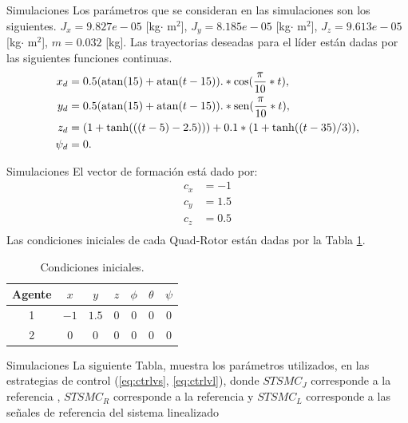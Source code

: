 \documentclass[hyperref={pdfpagelabels=false}]{beamer}
\begin{document}
\begin{frame}{Simulaciones}
Los parámetros que se consideran en las simulaciones son los siguientes.  $J_x=9.827e-05$ [kg$\cdot$ m$^2$], $J_y=8.185e-05$ [kg$\cdot$ m$^2$], $J_z=9.613e-05$ [kg$\cdot$ m$^2$], $m= 0.032$ [kg]. Las trayectorias deseadas para el líder están dadas por las siguientes funciones continuas.
\begin{equation}
\begin{split}
x_d &=0.5(\operatorname{atan}(15)+\operatorname{atan}(t-15)).*\cos(\frac{\pi}{10}*t),\\
y_d &=0.5(\operatorname{atan}(15)+\operatorname{atan}(t-15)).*\operatorname{sen}(\frac{\pi}{10}*t),\\
z_d &=(1+\operatorname{tanh}(((t-5)-2.5)))+0.1*(1+\operatorname{tanh}((t-35)/3)),\\
\psi_d &= 0.\\
\end{split}    
\end{equation}

\end{frame}

\begin{frame}{Simulaciones}
El vector de formación está dado por:
\begin{equation}
    \begin{split}
        c_x &= -1\\
        c_y &= 1.5\\
        c_z &= 0.5\\
    \end{split}
\end{equation}
Las condiciones iniciales de cada Quad-Rotor están dadas por la Tabla \ref{tab:tab5}.
\begin{table}[h]
\begin{center}
\begin{tabular}{ c  c  c  c  c  c  c  }
\hline
 Agente & $x$  & $y$ & $z$ & $\phi$ & $\theta$ & $\psi$ \\ \hline
1      & $-1$   & $1.5$ & $0$ & $0$    & $0$      &   $0$  \\ \hline
2      & $0$   & $0$ & $0$ & $0$    & $0$      &   $0$  \\ \hline
\end{tabular}
\caption{Condiciones iniciales.}
\label{tab:tab5}
\end{center}
\end{table}
\end{frame}

\begin{frame}{Simulaciones}
	La siguiente Tabla, muestra los parámetros utilizados, en las estrategias de control (\ref{eq:ctrlvs}, \ref{eq:ctrlvl}), donde $STSMC_J$ corresponde a la referencia , $STSMC_R$ corresponde a la referencia  y $STSMC_L$ corresponde a las se\~nales de referencia del sistema linealizado 
\end{frame}
\end{document}
